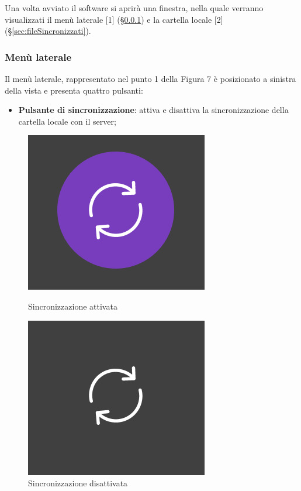 Una volta avviato il software si aprirà una finestra, nella quale verranno visualizzati il menù laterale [1] (\S{}\ref{sec:menu}) e la cartella locale [2] (\S{}\ref{sec:fileSincronizzati}).
\subsubsection{Menù laterale}
\label{sec:menu}

Il menù laterale, rappresentato nel punto 1 della Figura 7 è posizionato a sinistra della vista e presenta quattro pulsanti:
\begin{itemize}
\item \textbf{Pulsante di sincronizzazione}: attiva e disattiva la sincronizzazione della cartella locale con il server; \
\end{itemize}

\begin{figure}[H]
\centering
\begin{minipage}[b]{0.45\linewidth}
\centering
\includegraphics[scale=0.5]{components/img/SyncA.png}
\caption{Sincronizzazione attivata}
\label{fig:syncA}
\end{minipage}
\quad
\begin{minipage}[b]{0.45\linewidth}
\centering
\includegraphics[scale=0.5]{components/img/SyncD.png}
\caption{Sincronizzazione disattivata}
\label{fig:syncD}
\end{minipage}
\end{figure}

